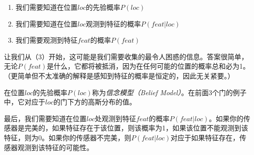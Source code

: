 \begin{enumerate}

\item 我们需要知道在位置$loc$的先验概率$P(loc)$
\item 我们需要知道在位置$loc$观测到特征的概率$P(feat|loc)$
\item 我们需要观测到特征$feat$的概率$P(feat)$
\end{enumerate}


让我们从（3）开始，这可能是我们需要收集的最令人困惑的信息。答案很简单，无论$P(feat)$是什么，它都将被抵消，因为在任何可能的位置的概率总和必为1。（更简单但不太准确的解释是感知到特征的概率是恒定的，因此无关紧要。）


在位置$loc$的先验概率$P(loc)$称为\emph{信念模型（Belief Model）}。在前面3个门的例子中，它对应于$loc$的门下方的高斯分布的值。


最后，我们需要知道在位置$loc$处观测到特征$feat$的概率$P(feat|loc)$。如果你的传感器是完美的，如果特征存在于该位置，则该概率为1，如果该位置不能观测到该特征，则为0。如果你的传感器不完美，则$P(feat|loc)$对应于如果特征存在，传感器观测到该特征的可能性。

